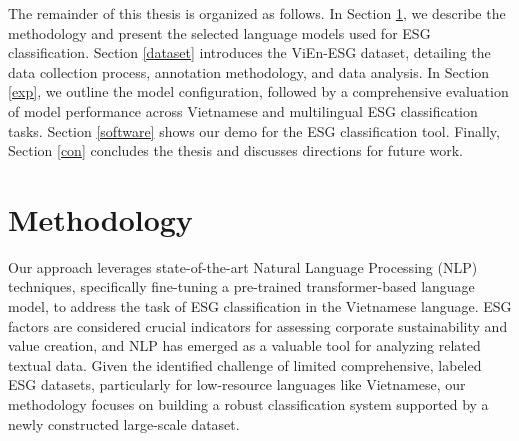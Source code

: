 \documentclass[12pt, letterpaper]{template}
\begin{document}

The remainder of this thesis is organized as follows. In Section \ref{methodology}, we describe the methodology and present the selected language models used for ESG classification. Section \ref{dataset} introduces the ViEn-ESG dataset, detailing the data collection process, annotation methodology, and data analysis. In Section \ref{exp}, we outline the model configuration, followed by a comprehensive evaluation of model performance across Vietnamese and multilingual ESG classification tasks. Section \ref{software} shows our demo for the ESG classification tool. Finally, Section \ref{con} concludes the thesis and discusses directions for future work.

\section{Methodology} \label{methodology}

Our approach leverages state-of-the-art Natural Language Processing (NLP) techniques, specifically fine-tuning a pre-trained transformer-based language model, to address the task of ESG classification in the Vietnamese language. ESG factors are considered crucial indicators for assessing corporate sustainability and value creation, and NLP has emerged as a valuable tool for analyzing related textual data. Given the identified challenge of limited comprehensive, labeled ESG datasets, particularly for low-resource languages like Vietnamese, our methodology focuses on building a robust classification system supported by a newly constructed large-scale dataset.
\end{document}
